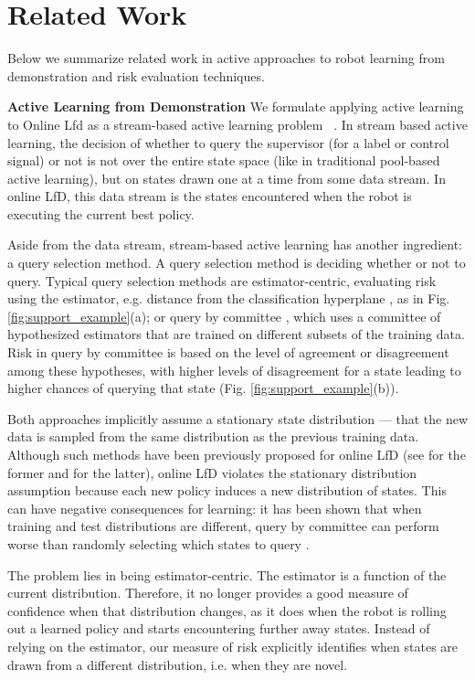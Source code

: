 \documentclass[10pt, conference]{ieeeconf}      %
\begin{document}
\section{Related Work}
Below we summarize related work in active approaches to robot learning from demonstration and risk evaluation techniques.

\noindent\textbf{Active Learning from Demonstration}
We formulate applying active learning to Online Lfd as a stream-based active learning problem ~\cite{atlas1990training,cohn1994improving}. In stream based active learning, the decision of whether to query the supervisor (for a label or control signal) or not is not over the entire state space (like in traditional pool-based active learning), but on states drawn one at a time from some data stream. In  online LfD, this data stream is the states encountered when the robot is executing the current best policy.

Aside from the data stream, stream-based active learning has another ingredient: a query selection method. A query selection method is deciding whether or not to query. Typical query selection methods are estimator-centric, evaluating risk using the estimator, e.g. distance from the classification hyperplane \cite{tong2002support}, as in Fig. \ref{fig:support_example}(a); or query by committee  \cite{breiman1996bagging}, which uses a committee of hypothesized estimators that are trained on different subsets of the training data. Risk in query by committee is based on the level of agreement or disagreement among these hypotheses, with higher levels of disagreement for a state leading to higher chances of querying that state (Fig. \ref{fig:support_example}(b)).

Both approaches implicitly assume a stationary state distribution --- that the new data is sampled from the same distribution as the previous training data. Although such methods have been previously proposed for online LfD (see \cite{chernova2009interactive,grollman2007dogged} for the former and \cite{judah2011active,judah2012active} for the latter),
online LfD violates the stationary distribution assumption because each new policy induces a new distribution of states. This can have negative consequences for learning: it has been shown that when training and test distributions are different, query by committee can perform worse than randomly selecting  which states to query \cite{burbidge2007active}.

The problem lies in being estimator-centric. The  estimator is a function of the current distribution. Therefore, it no longer provides a good measure of confidence when that distribution changes, as it does when the robot is rolling out a learned policy and starts encountering further away states. Instead of relying on the estimator, our measure of risk explicitly identifies when states are drawn from a different distribution, i.e. when they are novel. 
\end{document}
